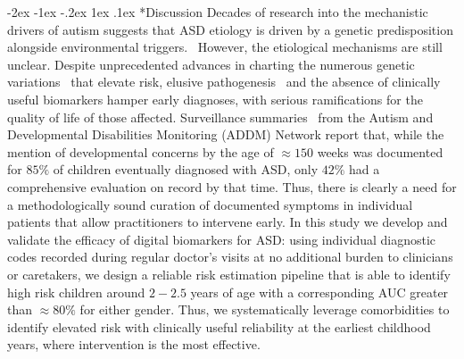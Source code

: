 \documentclass[onecolumn,,10pt]{IEEEtran}
\makeatletter
\renewcommand\section{\@startsection {section}{1}{\z@}%
  {-2ex \@plus -1ex \@minus -.2ex}%
  {1ex \@plus.1ex}%
  {\Large\bfseries\scshape}}
\makeatother
\begin{document}
\section*{Discussion}
Decades of research into the mechanistic drivers of autism suggests  that ASD  etiology is  driven by  a genetic predisposition alongside  environmental triggers.~\cite{pmid30941018,pmid23226953} However, the  etiological mechanisms are  still unclear.
Despite unprecedented  advances in charting the numerous genetic variations~\cite{Satterstrom484113} that elevate risk, elusive  pathogenesis~\cite{pmid29691724,pmid29307081} and the absence of clinically useful biomarkers  hamper early diagnoses, with serious ramifications for the quality of life of those affected. Surveillance summaries~\cite{pmid29701730} from the Autism and Developmental Disabilities Monitoring (ADDM) Network report that, while the mention of developmental concerns by the age of $\approx 150$ weeks was documented for $85\%$ of children eventually diagnosed with ASD, only $42\%$ had a comprehensive evaluation on record by that time. Thus, there is clearly a need for a methodologically sound   curation of documented symptoms in individual patients that allow practitioners to intervene early.
In this study we develop and validate the efficacy  of digital biomarkers for ASD: using individual diagnostic codes recorded during regular doctor's visits at no additional burden to clinicians or caretakers, we  design a reliable risk estimation pipeline that is able to identify high risk children around $2-2.5$ years of age with a corresponding AUC greater than $\approx 80\%$ for either gender. Thus, we systematically leverage comorbidities to identify elevated  risk with clinically useful reliability at the earliest childhood years, where intervention is the most effective.~\cite{pmid23935565,pmid23226953}
\end{document}
